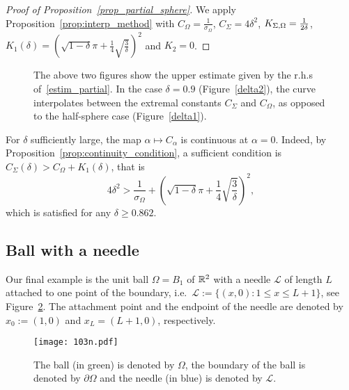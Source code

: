 \documentclass[a4paper]{article}
\theoremstyle{definition}
\numberwithin{equation}{section}
\begin{document}
\begin{proof}[Proof of Proposition~\ref{prop_partial_sphere}]
We apply Proposition~\ref{prop:interp_method} with $C_\Omega = \frac{1}{\sigma_{\Omega}}$, $C_\Sigma=4\delta^2$, $K_{\Sigma,\Omega}=\frac{1}{2\delta}$, $K_1(\delta)= \left( \sqrt{1-\delta}\pi + \frac{1}{4}\sqrt{\frac{3}{\delta}} \right)^2$ and $K_2=0$. 
\end{proof}


\begin{figure}[ht]
\centering
{}
\caption{The above two figures show the upper estimate given by the r.h.s of~\eqref{estim_partial}. 
In the case $\delta=0.9$ (Figure~\ref{delta2}), the curve interpolates between the extremal constants $C_\Sigma$ and $C_\Omega$, as opposed to the half-sphere case (Figure~\ref{delta1}).}
\label{fig:partial ball}
\end{figure}

For $\delta$ sufficiently large, the map $\alpha \mapsto C_\alpha$ is continuous at $\alpha=0$. Indeed, by Proposition~\ref{prop:continuity_condition}, a sufficient condition is $C_\Sigma(\delta) > C_\Omega + K_1(\delta)$, that is
\[4 \delta^2 > \frac{1}{\sigma_{\Omega}}+ \left( \sqrt{1-\delta}\pi + \frac{1}{4}\sqrt{\frac{3}{\delta}} \right)^2, \]
which is satisfied for any $\delta \geq 0.862$.

\subsection{Ball with a needle}
\label{subsec:needle}

 Our final example is the  unit ball $\Omega=B_1$  of $\mathbb{R}^2$ with a needle $\mathcal L$   of length $L$  attached to one point of the boundary, i.e.\  $\mathcal L:=\{ (x,0): 1\leq x \leq L+1\}$, see Figure~\ref{fig:needle}.
The attachment point and the endpoint of the needle are denoted by $x_0:=(1,0)$ and $x_L=(L+1,0)$, respectively.

\begin{figure}[ht]
\centering
  \texttt{[image: 103n.pdf]}
  \caption{The ball (in green) is denoted by $\Omega$, the boundary of the ball is denoted by $\partial \Omega$ and the needle (in blue) is denoted by $\mathcal L$.}
  \label{fig:needle}
\end{figure}
\end{document}
